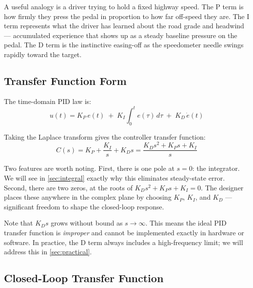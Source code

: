 \documentclass[../../book.tex]{subfiles}
\begin{document}
A useful analogy is a driver trying to hold a fixed highway speed.  The P term
is how firmly they press the pedal in proportion to how far off-speed they are.
The I term represents what the driver has learned about the road grade and
headwind --- accumulated experience that shows up as a steady baseline pressure
on the pedal.  The D term is the instinctive easing-off as the speedometer
needle swings rapidly toward the target.

\subsection{Transfer Function Form}

The time-domain PID law is:
\begin{equation}
  u(t) = K_P\, e(t) \;+\; K_I \int_0^t e(\tau)\,d\tau \;+\; K_D\, \dot{e}(t)
  \label{eq:pid_time}
\end{equation}

Taking the Laplace transform gives the controller transfer function:
\begin{equation}
  C(s) = K_P + \frac{K_I}{s} + K_D s = \frac{K_D s^2 + K_P s + K_I}{s}
  \label{eq:pid_tf}
\end{equation}

Two features are worth noting.  First, there is one pole at $s = 0$: the
integrator.  We will see in \cref{sec:integral} exactly why this eliminates
steady-state error.  Second, there are two zeros, at the roots of
$K_D s^2 + K_P s + K_I = 0$.  The designer places these anywhere in the
complex plane by choosing $K_P$, $K_I$, and $K_D$ --- significant freedom to
shape the closed-loop response.

Note that $K_D s$ grows without bound as $s \to \infty$.  This means the ideal
PID transfer function is \emph{improper} and cannot be implemented exactly in
hardware or software.  In practice, the D term always includes a high-frequency
limit; we will address this in \cref{sec:practical}.

\subsection{Closed-Loop Transfer Function}
\end{document}
